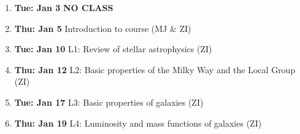 \documentclass[10pt]{article}
\begin{document}
\vskip 0.2in
\begin{enumerate}
  \item {\bf Tue: Jan 3}  {\bf NO CLASS}
  \item {\bf Thu: Jan 5}   Introduction to course  (MJ \& ZI) 
  \item {\bf Tue: Jan 10}  L1: Review of stellar astrophysics (ZI)
  \item {\bf Thu: Jan 12}  L2: Basic properties of the Milky Way and the Local Group (ZI)
  \item {\bf Tue: Jan 17}  L3: Basic properties of galaxies (ZI)
  \item {\bf Thu: Jan 19}  L4: Luminosity and mass functions of galaxies (ZI)

\end{enumerate}
\end{document}
